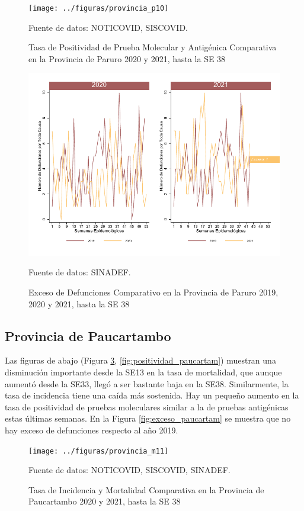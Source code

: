 \documentclass[12pt,a4paper,openany]{book}
\begin{document}
	\begin{figure}[h]
	\caption{Tasa de Positividad de Prueba Molecular y Antigénica Comparativa en la Provincia de Paruro 2020 y 2021, hasta la SE 38}\label{fig:positividad_paruro}
	\begin{center}
		\texttt{[image: ../figuras/provincia\_p10]}
	\end{center}
	{\footnotesize {Fuente de datos: NOTICOVID, SISCOVID.}}
	\end{figure}

	\begin{figure}[h]
	\caption{Exceso de Defunciones Comparativo en la Provincia de Paruro 2019, 2020 y 2021, hasta la SE 38}\label{fig:exceso_paruro}
	\begin{center}
		\includegraphics[width=0.7\linewidth]{../figuras/exceso_10}
	\end{center}
	{\footnotesize {Fuente de datos: SINADEF.}}
	\end{figure}


\clearpage

	\subsection*{Provincia de Paucartambo}
	\noindent Las figuras de abajo (Figura \ref{fig:inc_mort_paucartam}, \ref{fig:positividad_paucartam})  muestran una disminución importante desde la SE13 en la tasa de mortalidad, que aunque aumentó desde la SE33, llegó a ser bastante baja en la SE38. Similarmente, la tasa de incidencia tiene una caída más sostenida. Hay un pequeño aumento en la tasa de positividad de pruebas moleculares similar a la de pruebas antigénicas estas últimas semanas. En la Figura \ref{fig:exceso_paucartam} se muestra que no hay exceso de defunciones respecto al año 2019.

	\begin{figure}[h]
	\caption{Tasa de Incidencia y Mortalidad Comparativa en la Provincia de Paucartambo 2020 y 2021, hasta la SE 38}\label{fig:inc_mort_paucartam}
	\begin{center}
		\texttt{[image: ../figuras/provincia\_m11]}
	\end{center}
	{\footnotesize {Fuente de datos: NOTICOVID, SISCOVID, SINADEF.}}
	\end{figure}
\end{document}
